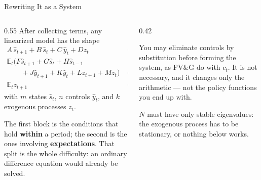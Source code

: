 \begin{frame}{Rewriting It as a System}
\begin{columns}[T]
\begin{column}{0.55\textwidth}
\small
After collecting terms, any linearized model has the shape
\begin{align*}
 A\,\hat{s}_{t+1} + B\,\hat{s}_{t} + C\,\hat{y}_{t} + D z_t &= 0\\
 \mathbb{E}_t\big(F\hat{s}_{t+1}+G\hat{s}_t+H\hat{s}_{t-1}\\
 \qquad +J\hat{y}_{t+1}+K\hat{y}_t+Lz_{t+1}+Mz_t\big)&=0\\
 \mathbb{E}_t z_{t+1} &= N z_t
\end{align*}
with $m$ states $\hat{s}_t$, $n$ controls $\hat{y}_t$, and $k$ exogenous processes $z_t$.
\medskip

The first block is the conditions that hold \textbf{within} a period; the second is the ones involving \textbf{expectations}. That split is the whole difficulty: an ordinary difference equation would already be solved.
\end{column}
\begin{column}{0.42\textwidth}
\begin{examplebox}\footnotesize
You may eliminate controls by substitution before forming the system, as FV\&G do with $c_t$. It is not necessary, and it changes only the arithmetic --- not the policy functions you end up with.
\end{examplebox}
\medskip
\begin{cautionbox}\footnotesize
$N$ must have only stable eigenvalues: the exogenous process has to be stationary, or nothing below works.
\end{cautionbox}
\end{column}
\end{columns}
\vspace{1mm}
\end{frame}

